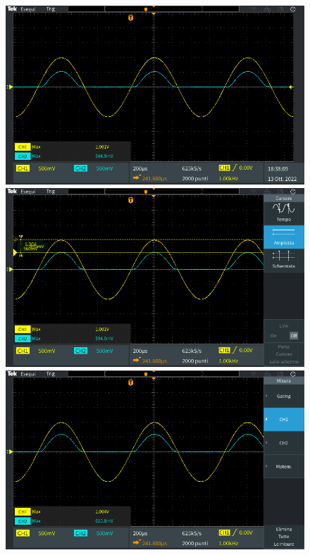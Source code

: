 \begin{figure}[!ht]
	\centering
	\begin{minipage}{.496\textwidth}
				\includegraphics[width=\linewidth]{./ImageFiles/Laboratorio 2/TEK00000.PNG}
	\end{minipage}
	\begin{minipage}{.496\textwidth}
		\includegraphics[width=\linewidth]{./ImageFiles/Laboratorio 2/TEK00009.PNG}
	\end{minipage}
	\begin{minipage}{.496\textwidth}
	\includegraphics[width=\linewidth]{./ImageFiles/Laboratorio 2/TEK00003.PNG}

\end{minipage}
\end{figure}
